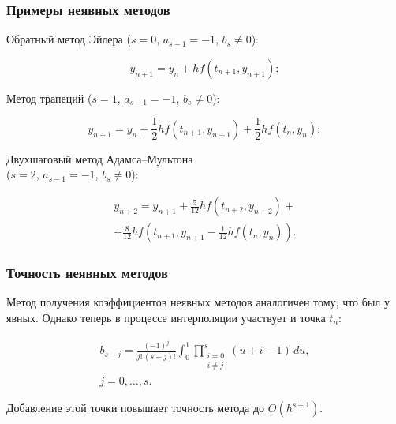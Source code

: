 \begin{frame}
\frametitle{Примеры неявных методов}

Обратный метод Эйлера ($s = 0$, $a_{s-1} = -1$, $b_s \neq 0$):

\su
\begin{equation}
  y_{n+1} = y_n + h f(t_{n+1}, y_{n+1});
\end{equation}

Метод трапеций ($s = 1$, $a_{s-1} = -1$, $b_s \neq 0$):

\su
\begin{equation}
  y_{n+1} = y_n + \frac{1}{2} h f(t_{n+1}, y_{n+1}) + \frac{1}{2} h f(t_n, y_n);
\end{equation}

Двухшаговый метод Адамса--Мультона \\
($s = 2$, $a_{s-1} = -1$, $b_s \neq 0$):

\su
\begin{equation}
\begin{gathered}
  y_{n+2} = y_{n+1} + \frac{5}{12} h f(t_{n+2}, y_{n+2}) + \\
  + \frac{8}{12} h f(t_{n+1}, y_{n+1} - \frac{1}{12} h f(t_n, y_n)).
\end{gathered}
\end{equation}

\end{frame}

\begin{frame}
\frametitle{Точность неявных методов}

Метод получения коэффициентов неявных методов аналогичен тому, что был у явных. Однако теперь в процессе интерполяции участвует и точка $ t_n $:

\su
\begin{equation}
\begin{gathered}
  b_{s-j} = \frac{(-1)^j}{j! \, (s-j)!} \int_0^1 \prod_{\substack{i=0 \\ i \neq j}}^s(u + i - 1) \, du, \\
  j = 0, \ldots, s.
\end{gathered}
\end{equation}

Добавление этой точки повышает точность метода до $ O(h^{s+1}) $.

\end{frame}

